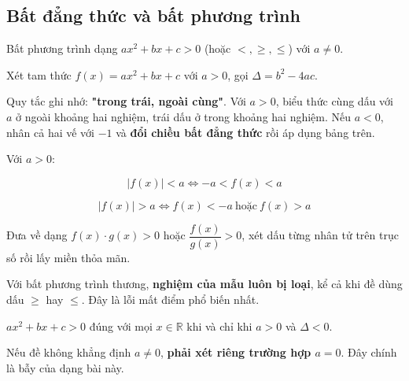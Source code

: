 \documentclass[11pt, a4paper]{article}
\begin{document}
\subsection{Bất đẳng thức và bất phương trình}

\begin{dinhnghia}
Bất phương trình dạng $ax^2 + bx + c > 0$ (hoặc $<, \ge, \le$) với $a \neq 0$.
\end{dinhnghia}
\begin{dinhly}
Xét tam thức $f(x) = ax^2 + bx + c$ với $a > 0$, gọi $\Delta = b^2 - 4ac$.


 Quy tắc ghi nhớ: \textbf{"trong trái, ngoài cùng"}. Với $a > 0$, biểu thức cùng dấu với $a$ ở ngoài khoảng hai nghiệm, trái dấu ở trong khoảng hai nghiệm. Nếu $a < 0$, nhân cả hai vế với $-1$ và \textbf{đổi chiều bất đẳng thức} rồi áp dụng bảng trên.
\end{dinhly}
\begin{dinhly}
Với $a > 0$:

$$|f(x)| < a \iff -a < f(x) < a$$

$$|f(x)| > a \iff f(x) < -a \ \text{hoặc} \ f(x) > a$$
\end{dinhly}
\begin{dinhly}
Đưa về dạng $f(x) \cdot g(x) > 0$ hoặc $\dfrac{f(x)}{g(x)} > 0$, xét dấu từng nhân tử trên trục số rồi lấy miền thỏa mãn.

 Với bất phương trình thương, \textbf{nghiệm của mẫu luôn bị loại}, kể cả khi đề dùng dấu $\ge$ hay $\le$. Đây là lỗi mất điểm phổ biến nhất.
\end{dinhly}
\begin{dinhly}
$ax^2 + bx + c > 0$ đúng với mọi $x \in \mathbb{R}$ khi và chỉ khi $a > 0$ và $\Delta < 0$.

 Nếu đề không khẳng định $a \neq 0$, \textbf{phải xét riêng trường hợp $a = 0$}. Đây chính là bẫy của dạng bài này.
\end{dinhly}
\end{document}
